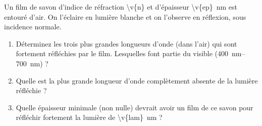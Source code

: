 Un film de savon d'indice de réfraction \num{\v{n}} et d'épaisseur \qty{\v{ep}}{nm} est entouré d'air. On l'éclaire en lumière blanche et on l'observe en réflexion, sous incidence normale.

\begin{enumerate}[label=\alph*)]
    \item Déterminez les trois plus grandes longueurs d'onde (dans l'air) qui sont fortement réfléchies par le film. Lesquelles font partie du visible (\qtyrange{400}{700}{nm}) ?
    \item Quelle est la plus grande longueur d'onde complètement absente de la lumière réfléchie ?
    \item Quelle épaisseur minimale (non nulle) devrait avoir un film de ce savon pour réfléchir fortement la lumière de \qty{\v{lam}}{nm} ?
\end{enumerate}
